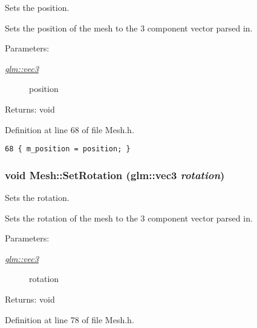 Sets the position. 

Sets the position of the mesh to the 3 component vector parsed in.

\begin{Desc}
\item[Parameters:]
\begin{description}
\item[{\em \hyperlink{group__core__types_g1c47e8b3386109bc992b6c48e91b0be7}{glm::vec3}}]position \end{description}
\end{Desc}
\begin{Desc}
\item[Returns:]void \end{Desc}


Definition at line 68 of file Mesh.h.

\begin{Code}\begin{verbatim}68 { m_position = position; }
\end{verbatim}
\end{Code}


\hypertarget{class_mesh_519811cebec8a556190226ed3da06390}{
\subsubsection[SetRotation]{\setlength{\rightskip}{0pt plus 5cm}void Mesh::SetRotation ({\bf glm::vec3} {\em rotation})}}
\label{class_mesh_519811cebec8a556190226ed3da06390}


Sets the rotation. 

Sets the rotation of the mesh to the 3 component vector parsed in.

\begin{Desc}
\item[Parameters:]
\begin{description}
\item[{\em \hyperlink{group__core__types_g1c47e8b3386109bc992b6c48e91b0be7}{glm::vec3}}]rotation \end{description}
\end{Desc}
\begin{Desc}
\item[Returns:]void \end{Desc}


Definition at line 78 of file Mesh.h.

